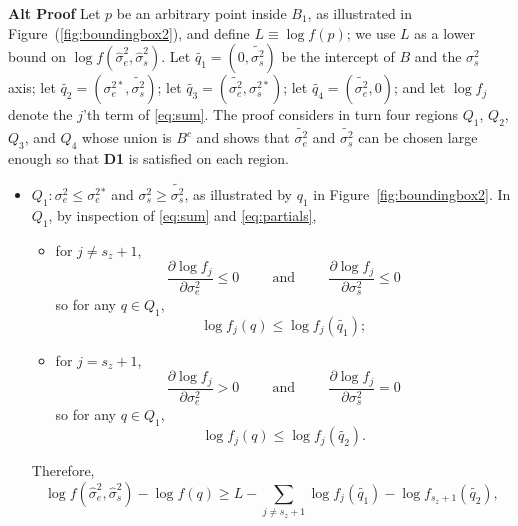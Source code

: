 \documentclass{report}
\newcommand{\RL}{f}
\newcommand{\logRL}{\log\RL}
\newcommand{\sigssq}{\sigma_s^2}
\newcommand{\sigesq}{\sigma_e^2}
\newcommand{\sshat}{\hat\sigma^2_e,\hat\sigma^2_s}
\begin{document}
\noindent\textbf{Alt Proof}
Let $p$ be an arbitrary point inside $B_1$, as illustrated in Figure~(\ref{fig:boundingbox2}), and define $L \equiv \logRL(p)$; we use $L$ as a lower bound on $\logRL(\sshat)$.  Let $\widetilde{q_1} = (0,\widetilde{\sigma_s^2})$ be the intercept of $B$ and the $\sigssq$ axis; let $\widetilde{q_2} = (\sigma_e^{2*},\widetilde{\sigma_s^2})$; let $\widetilde{q_3} = (\widetilde{\sigma_e^2}, \sigma_s^{2*})$; let $\widetilde{q_4} = (\widetilde{\sigma_e^2},0)$; and let $\logRL_j$ denote the $j$'th term of \eqref{eq:sum}.  The proof considers in turn four regions $Q_1$, $Q_2$, $Q_3$, and $Q_4$ whose union is $B^c$ and shows that $\widetilde{\sigma_e^2}$ and $\widetilde{\sigma_s^2}$ can be chosen large enough so that \textbf{D1} is satisfied on each region.  
\begin{itemize}
\item $Q_1: \sigesq \le \sigesq{}^*$ and $\sigssq \ge \widetilde{\sigssq}$, as illustrated by $q_1$ in
  Figure~\ref{fig:boundingbox2}.  In $Q_1$, by inspection of \eqref{eq:sum} and \eqref{eq:partials},
  \begin{itemize}
  \item for $j \ne s_z+1$,
    \begin{equation*}
      \frac{\partial\logRL_j}{\partial\sigesq} \le 0 \hspace{1cm} \text{and} \hspace{1cm}
      \frac{\partial\logRL_j}{\partial\sigssq} \le 0
    \end{equation*}
    so for any $q \in Q_1$,
    \begin{equation*}
      \logRL_j(q) \le \logRL_j(\widetilde{q_1});
    \end{equation*}
  \item  for $j = s_z+1$,
    \begin{equation*}
      \frac{\partial\logRL_j}{\partial\sigesq} > 0 \hspace{1cm} \text{and} \hspace{1cm}
      \frac{\partial\logRL_j}{\partial\sigssq} = 0
    \end{equation*}
    so for any $q \in Q_1$,
    \begin{equation*}
      \logRL_j(q) \le \logRL_j(\widetilde{q_2}).
    \end{equation*}
  \end{itemize}
  Therefore, 
  \begin{equation}
	\logRL(\sshat) - \logRL(q) \ge L - \sum_{j \ne s_z+1} \logRL_j(\widetilde{q_1}) - \logRL_{s_z+1}(\widetilde{q_2}),

\end{equation}
\end{itemize}
\end{document}

